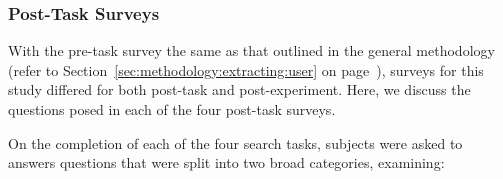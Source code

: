 %
%

\subsubsection{Post-Task Surveys}\label{sec:diversity:users:posttask}
With the pre-task survey the same as that outlined in the general methodology (refer to Section~\ref{sec:methodology:extracting:user} on page~\pageref{sec:methodology:extracting:user}), surveys for this study differed for both post-task and post-experiment. Here, we discuss the questions posed in each of the four post-task surveys.

On the completion of each of the four search tasks, subjects were asked to answers questions that were split into two broad categories, examining:


